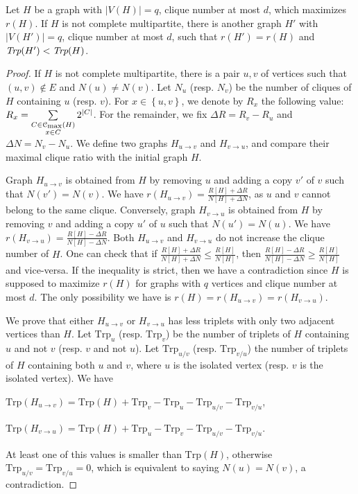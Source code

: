 \documentclass[a4paper,UKenglish,numberwithinsect,cleveref, autoref]{lipics-v2021}
\newcommand{\set}[1]{\left\{ #1 \right\}}
\newcommand{\card}[1]{\left| #1 \right|}
\newcommand{\mcalcm}{\mathcal{C}_{\mbox{\scriptsize{max}}}}
\newcommand{\trp}{\mbox{Trp}}
\newcommand{\huv}{H_{u \rightarrow v}}
\newcommand{\hvu}{H_{v \rightarrow u}}
\begin{document}
\begin{theorem}
Let $H$ be a graph with $\card{V(H)} = q$, clique number at most $d$, which maximizes $r(H)$. If $H$ is not complete multipartite, there is another graph $H'$ with $\card{V(H')} = q$, clique number at most $d$, such that $r(H') = r(H)$ and $\emph{Trp}(H') < \emph{Trp}(H)$. 
\label{th:complete_multi}
\end{theorem}
\begin{proof}
If $H$ is not complete multipartite, there is a pair $u,v$ of vertices such that $(u,v) \notin E$ and $N(u) \neq N(v)$. Let $N_u$ (resp. $N_v$) be the number of cliques of $H$ containing $u$ (resp. $v$). For $x \in \set{u,v}$, we denote by $R_x$ the following value: $R_x = \sum\limits_{\substack{C \in \mcalcm(H) \\ x \in C}} 2^{\card{C}}$. For the remainder, we fix $\Delta R = R_v - R_u$ and $\Delta N = N_v - N_u$.
We define two graphs $\huv$ and $\hvu$, and compare their maximal clique ratio with the initial graph $H$.

Graph $\huv$ is obtained from $H$ by removing $u$ and adding a copy $v'$ of $v$ such that $N(v') = N(v)$. We have $r(\huv) = \frac{R\left[ H\right] + \Delta R}{N\left[ H\right] + \Delta N}$, as $u$ and $v$ cannot belong to the same clique. Conversely, graph $\hvu$ is obtained from $H$ by removing $v$ and adding a copy $u'$ of $u$ such that $N(u') = N(u)$. We have $r(\hvu) = \frac{R\left[ H\right] - \Delta R}{N\left[ H\right] - \Delta N}$. Both $\huv$ and $\hvu$ do not increase the clique number of $H$. One can check that if $\frac{R\left[ H\right] + \Delta R}{N\left[ H\right] + \Delta N} \le \frac{R\left[ H\right]}{N\left[ H\right]}$, then $\frac{R\left[ H\right] - \Delta R}{N\left[ H\right] - \Delta N} \ge \frac{R\left[ H\right]}{N\left[ H\right]}$ and vice-versa. If the inequality is strict, then we have a contradiction since $H$ is supposed to maximize $r(H)$ for graphs with $q$ vertices and clique number at most $d$. The only possibility we have is $r(H) = r(\huv) = r(\hvu)$.

We prove that either $\huv$ or $\hvu$ has less triplets with only two adjacent vertices than $H$. Let $\trp_u$ (resp. $\trp_v$) be the number of triplets of $H$ containing $u$ and not $v$ (resp. $v$ and not $u$). Let $\trp_{u/v}$ (resp. $\trp_{v/u}$) the number of triplets of $H$ containing both $u$ and $v$, where $u$ is the isolated vertex (resp. $v$ is the isolated vertex). We have
\begin{description}
    \item $\trp(\huv) = \trp(H) + \trp_v - \trp_u - \trp_{u/v} - \trp_{v/u}$,
    \item $\trp(\hvu) = \trp(H) + \trp_u - \trp_v - \trp_{u/v} - \trp_{v/u}$.
\end{description}
At least one of this values is smaller than $\trp(H)$, otherwise $\trp_{u/v} = \trp_{v/u} = 0$, which is equivalent to saying $N(u) = N(v)$, a contradiction.
\end{proof}
\end{document}
